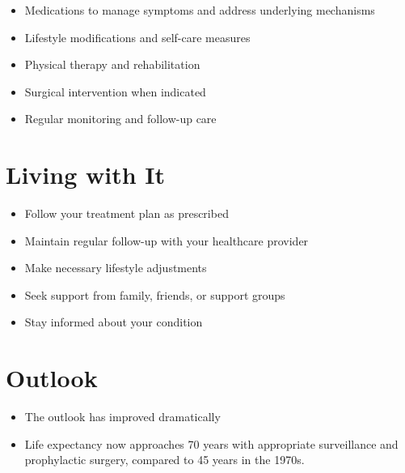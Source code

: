 \begin{itemize}[noitemsep]
  \item Medications to manage symptoms and address underlying mechanisms
  \item Lifestyle modifications and self-care measures
  \item Physical therapy and rehabilitation
  \item Surgical intervention when indicated
  \item Regular monitoring and follow-up care
\end{itemize}
\section{Living with It}
\begin{itemize}[noitemsep]
  \item Follow your treatment plan as prescribed
  \item Maintain regular follow-up with your healthcare provider
  \item Make necessary lifestyle adjustments
  \item Seek support from family, friends, or support groups
  \item Stay informed about your condition
\end{itemize}
\section{Outlook}
\begin{itemize}[noitemsep]
  \item The outlook has improved dramatically
  \item Life expectancy now approaches 70 years with appropriate surveillance and prophylactic surgery, compared to 45 years in the 1970s.
\end{itemize}
